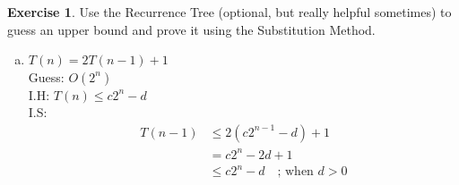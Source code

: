 \documentclass{article}
\theoremstyle{definition}
\newtheorem{exercise}{Exercise}[section]
\begin{document}
\begin{exercise}
    Use the Recurrence Tree (optional, but really helpful sometimes) to guess an upper bound and prove it using the Substitution Method. 
    \begin{enumerate}[a)]
        \item $T(n) = 2T(n-1) + 1$\\
            Guess: $O(2^n)$\\
            I.H: $T(n) \leqslant \textit{c}2^n-d$\\
            I.S: 
            \begin{align*}
                T(n-1) &\leqslant 2(c 2^{n-1}-d)+1\\
                &=  c2^n-2d+1\\
                &\leqslant c2^n -d \quad\text{;  when $d > 0$}               
            \end{align*}
            

\end{enumerate}
\end{exercise}
\end{document}
